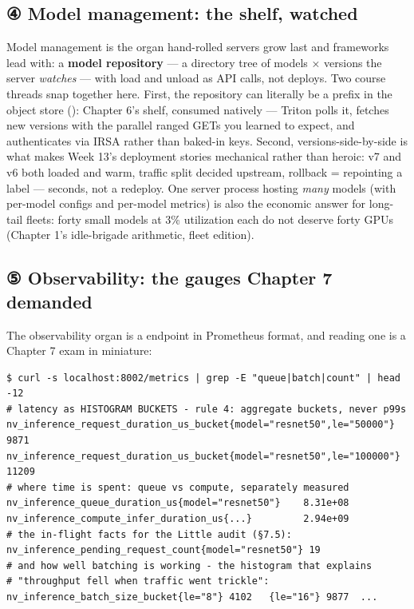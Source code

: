 \subsection*{④ Model management: the shelf, watched}

Model management is the organ hand-rolled servers grow last and frameworks lead with: a \textbf{model repository} — a directory tree of models × versions the server \textit{watches} — with load and unload as API calls, not deploys. Two course threads snap together here. First, the repository can literally be a prefix in the object store (): Chapter 6's shelf, consumed natively — Triton polls it, fetches new versions with the parallel ranged GETs you learned to expect, and authenticates via IRSA rather than baked-in keys. Second, versions-side-by-side is what makes Week 13's deployment stories mechanical rather than heroic: v7 and v6 both loaded and warm, traffic split decided upstream, rollback = repointing a label — seconds, not a redeploy. One server process hosting \textit{many} models (with per-model configs and per-model metrics) is also the economic answer for long-tail fleets: forty small models at 3\% utilization each do not deserve forty GPUs (Chapter 1's idle-brigade arithmetic, fleet edition).

\subsection*{⑤ Observability: the gauges Chapter 7 demanded}

The observability organ is a  endpoint in Prometheus format, and reading one is a Chapter 7 exam in miniature:

\begin{terminalbox}
\begin{Verbatim}[breaklines=true,breakanywhere=true,fontsize=\small,formatcom=\color{tbbtermfg},codes=\tbbcodeactive]
$ curl -s localhost:8002/metrics | grep -E "queue|batch|count" | head -12
# latency as HISTOGRAM BUCKETS - rule 4: aggregate buckets, never p99s
nv_inference_request_duration_us_bucket{model="resnet50",le="50000"} 9871
nv_inference_request_duration_us_bucket{model="resnet50",le="100000"} 11209
# where time is spent: queue vs compute, separately measured
nv_inference_queue_duration_us{model="resnet50"}    8.31e+08
nv_inference_compute_infer_duration_us{...}         2.94e+09
# the in-flight facts for the Little audit (§7.5):
nv_inference_pending_request_count{model="resnet50"} 19
# and how well batching is working - the histogram that explains
# "throughput fell when traffic went trickle":
nv_inference_batch_size_bucket{le="8"} 4102   {le="16"} 9877  ...
\end{Verbatim}
\end{terminalbox}

